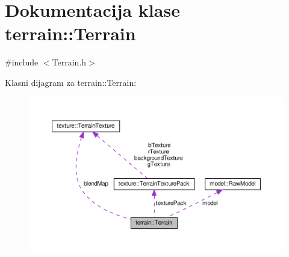 \hypertarget{classterrain_1_1Terrain}{}\section{Dokumentacija klase terrain\+:\+:Terrain}
\label{classterrain_1_1Terrain}


{\ttfamily \#include $<$Terrain.\+h$>$}



Klasni dijagram za terrain\+:\+:Terrain\+:
\nopagebreak
\begin{figure}[H]
\begin{center}
\leavevmode
\includegraphics[width=350pt]{classterrain_1_1Terrain__coll__graph}
\end{center}
\end{figure}
